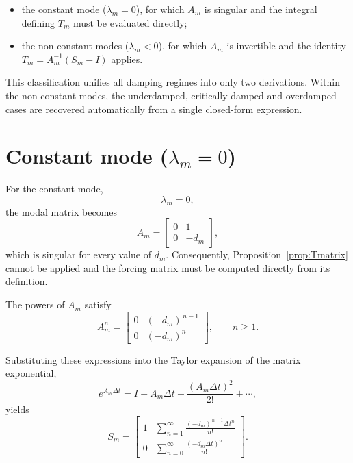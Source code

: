 \documentclass{Configuration_Files/PoliMi3i_thesis}
\begin{document}
\begin{itemize}
\item the constant mode (\(\lambda_m=0\)), for which \(A_m\) is singular and the integral defining \(T_m\) must be evaluated directly;

\item the non-constant modes (\(\lambda_m<0\)), for which \(A_m\) is invertible and the identity \(T_m=A_m^{-1}(S_m-I)\) applies.
\end{itemize}

This classification unifies all damping regimes into only two derivations. Within the non-constant modes, the underdamped, critically damped and overdamped cases are recovered automatically from a single closed-form expression.

\section{Constant mode (\texorpdfstring{$\lambda_m=0$}{lambda m = 0})}

For the constant mode,
\begin{equation*}
\lambda_m=0,
\end{equation*}
the modal matrix becomes
\begin{equation*}
A_m=
\begin{bmatrix}
0 & 1\\
0 & -d_m
\end{bmatrix},
\end{equation*}
which is singular for every value of \(d_m\). Consequently, Proposition~\ref{prop:Tmatrix} cannot be applied and the forcing matrix must be computed directly from its definition.

The powers of \(A_m\) satisfy
\begin{equation*}
A_m^n
=
\begin{bmatrix}
0 & (-d_m)^{\,n-1}\\
0 & (-d_m)^n
\end{bmatrix},
\qquad
n\ge1.
\end{equation*}

Substituting these expressions into the Taylor expansion of the matrix exponential,
\begin{equation*}
e^{A_m\Delta t}
=
I
+
A_m\Delta t
+
\frac{(A_m\Delta t)^2}{2!}
+\cdots,
\end{equation*}
yields
\begin{equation*}
S_m
=
\begin{bmatrix}
1 &
\displaystyle
\sum_{n=1}^{\infty}
\frac{(-d_m)^{\,n-1}\Delta t^n}{n!}
\\[3ex]
0 &
\displaystyle
\sum_{n=0}^{\infty}
\frac{(-d_m\Delta t)^n}{n!}
\end{bmatrix}.
\end{equation*}
\end{document}
